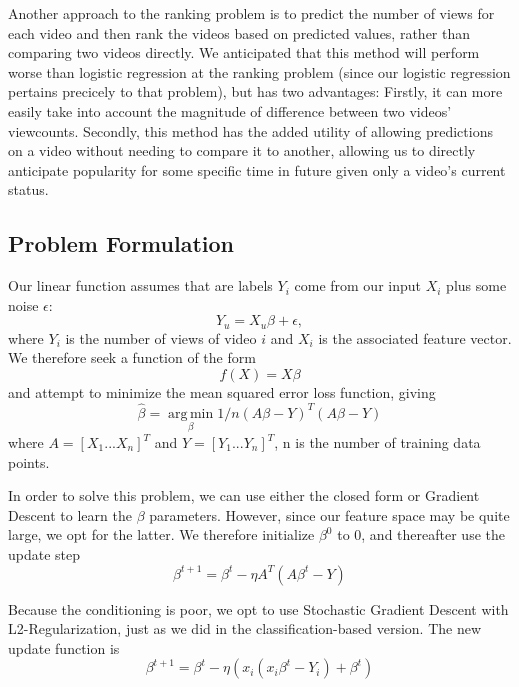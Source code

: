 Another approach to the ranking problem is to predict the number of views for each video and then rank the videos based on predicted values, rather than comparing two videos directly.  We anticipated that this method will perform worse than logistic regression at the ranking problem (since our logistic regression pertains precicely to that problem), but has two advantages: Firstly, it can more easily take into account the magnitude of difference between two videos' viewcounts. Secondly, this method has the added utility of allowing predictions on a video without needing to compare it to another, allowing us to directly anticipate popularity for some specific time in future given only a video's current status.

\subsection{Problem Formulation}
Our linear function assumes that are labels $Y_i$ come from our input $X_i$ plus some noise $\epsilon$:
\begin{equation}
Y_u = X_u \beta + \epsilon,
\end{equation}
where $Y_i$ is the number of views of video $i$ and $X_i$ is the associated feature vector. We therefore seek a function of the form
\begin{equation}
f(X) = X \beta
\end{equation}
and attempt to minimize the mean squared error loss function, giving
\begin{equation}
	\hat{\beta} = \operatorname*{arg\,min}_{\textbf{$\beta$}} 1/n (A \beta - Y)^T(A \beta - Y)
\end{equation}
where $A = [X_1 ... X_n]^T$ and $Y = [Y_1 ... Y_n]^T$, n is the number of training data points.

In order to solve this problem, we can use either the closed form or Gradient Descent to learn the $\beta$ parameters.  However, since our feature space may be quite large, we opt for the latter.  We therefore initialize $\beta^0$ to 0, and thereafter use the update step
\begin{equation}
\beta^{t+1} = \beta^t - \eta A^T (A \beta^t - Y)
\end{equation}
 
Because the conditioning is poor, we opt to use Stochastic Gradient Descent with L2-Regularization, just as we did in the classification-based version. The new update function is
	\begin{equation}
		\beta^{t+1} = \beta^t - \eta (x_i (x_i\beta^t - Y_i) + \beta^t)
	\end{equation}

